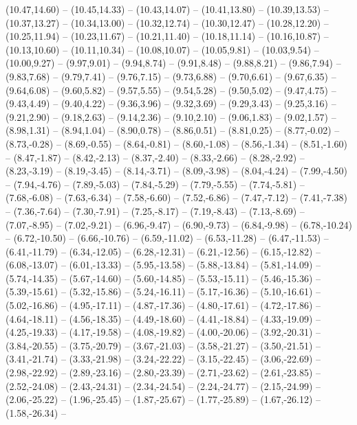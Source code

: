 {  (10.47,14.60) -- (10.45,14.33) -- (10.43,14.07) -- (10.41,13.80) -- (10.39,13.53) -- (10.37,13.27) -- (10.34,13.00) --
  (10.32,12.74) -- (10.30,12.47) -- (10.28,12.20) -- (10.25,11.94) -- (10.23,11.67) -- (10.21,11.40) -- (10.18,11.14) --
  (10.16,10.87) -- (10.13,10.60) -- (10.11,10.34) -- (10.08,10.07) -- (10.05,9.81) -- (10.03,9.54) -- (10.00,9.27) --
  (9.97,9.01) -- (9.94,8.74) -- (9.91,8.48) -- (9.88,8.21) -- (9.86,7.94) -- (9.83,7.68) -- (9.79,7.41) --
  (9.76,7.15) -- (9.73,6.88) -- (9.70,6.61) -- (9.67,6.35) -- (9.64,6.08) -- (9.60,5.82) -- (9.57,5.55) --
  (9.54,5.28) -- (9.50,5.02) -- (9.47,4.75) -- (9.43,4.49) -- (9.40,4.22) -- (9.36,3.96) -- (9.32,3.69) --
  (9.29,3.43) -- (9.25,3.16) -- (9.21,2.90) -- (9.18,2.63) -- (9.14,2.36) -- (9.10,2.10) -- (9.06,1.83) --
  (9.02,1.57) -- (8.98,1.31) -- (8.94,1.04) -- (8.90,0.78) -- (8.86,0.51) -- (8.81,0.25) -- (8.77,-0.02) --
  (8.73,-0.28) -- (8.69,-0.55) -- (8.64,-0.81) -- (8.60,-1.08) -- (8.56,-1.34) -- (8.51,-1.60) -- (8.47,-1.87) --
  (8.42,-2.13) -- (8.37,-2.40) -- (8.33,-2.66) -- (8.28,-2.92) -- (8.23,-3.19) -- (8.19,-3.45) -- (8.14,-3.71) --
  (8.09,-3.98) -- (8.04,-4.24) -- (7.99,-4.50) -- (7.94,-4.76) -- (7.89,-5.03) -- (7.84,-5.29) -- (7.79,-5.55) --
  (7.74,-5.81) -- (7.68,-6.08) -- (7.63,-6.34) -- (7.58,-6.60) -- (7.52,-6.86) -- (7.47,-7.12) -- (7.41,-7.38) --
  (7.36,-7.64) -- (7.30,-7.91) -- (7.25,-8.17) -- (7.19,-8.43) -- (7.13,-8.69) -- (7.07,-8.95) -- (7.02,-9.21) --
  (6.96,-9.47) -- (6.90,-9.73) -- (6.84,-9.98) -- (6.78,-10.24) -- (6.72,-10.50) -- (6.66,-10.76) -- (6.59,-11.02) --
  (6.53,-11.28) -- (6.47,-11.53) -- (6.41,-11.79) -- (6.34,-12.05) -- (6.28,-12.31) -- (6.21,-12.56) -- (6.15,-12.82) --
  (6.08,-13.07) -- (6.01,-13.33) -- (5.95,-13.58) -- (5.88,-13.84) -- (5.81,-14.09) -- (5.74,-14.35) -- (5.67,-14.60) --
  (5.60,-14.85) -- (5.53,-15.11) -- (5.46,-15.36) -- (5.39,-15.61) -- (5.32,-15.86) -- (5.24,-16.11) -- (5.17,-16.36) --
  (5.10,-16.61) -- (5.02,-16.86) -- (4.95,-17.11) -- (4.87,-17.36) -- (4.80,-17.61) -- (4.72,-17.86) -- (4.64,-18.11) --
  (4.56,-18.35) -- (4.49,-18.60) -- (4.41,-18.84) -- (4.33,-19.09) -- (4.25,-19.33) -- (4.17,-19.58) -- (4.08,-19.82) --
  (4.00,-20.06) -- (3.92,-20.31) -- (3.84,-20.55) -- (3.75,-20.79) -- (3.67,-21.03) -- (3.58,-21.27) -- (3.50,-21.51) --
  (3.41,-21.74) -- (3.33,-21.98) -- (3.24,-22.22) -- (3.15,-22.45) -- (3.06,-22.69) -- (2.98,-22.92) -- (2.89,-23.16) --
  (2.80,-23.39) -- (2.71,-23.62) -- (2.61,-23.85) -- (2.52,-24.08) -- (2.43,-24.31) -- (2.34,-24.54) -- (2.24,-24.77) --
  (2.15,-24.99) -- (2.06,-25.22) -- (1.96,-25.45) -- (1.87,-25.67) -- (1.77,-25.89) -- (1.67,-26.12) -- (1.58,-26.34) --
}
